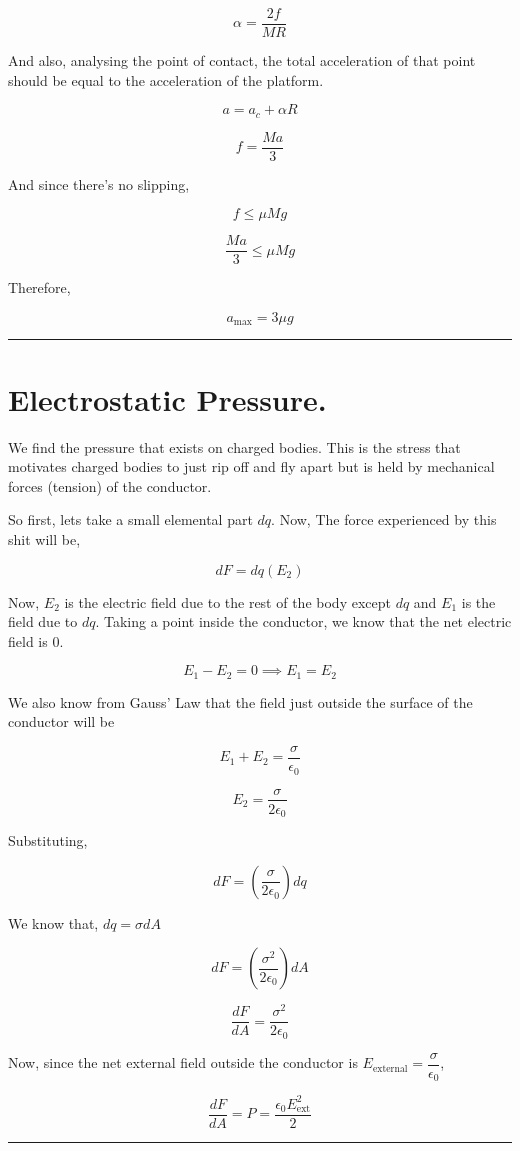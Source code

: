 \documentclass[twocolumn]{article}
\begin{document}
\[
    \alpha = \frac{2f}{M R}
\]

And also, analysing the point of contact, the total acceleration of that point should be equal to the acceleration of the platform. 

\[
    a = a_c + \alpha R
\]

\[
    f = \frac{Ma}{3}
\]

And since there's no slipping, 

\[
    f \leq  \mu Mg
\]

\[
    \frac{Ma}{3} \leq  \mu Mg
\]

Therefore, 

\[
    \boxed{a_{\text{max}} = 3\mu g}
\]

\vspace{0.1in}
\hrule

\section*{Electrostatic Pressure.}

We find the pressure that exists on charged bodies. This is the stress that motivates charged bodies to just rip off and fly apart but is held by mechanical forces (tension) of the conductor. 

So first, lets take a small elemental part \(dq\). Now, The force experienced by this shit will be,

\[
    dF = dq(E_2)
\]

Now, \(E_2\) is the electric field due to the rest of the body except \(dq\) and \(E_1\) is the field due to \(dq\). Taking a point inside the conductor, we know that the net electric field is 0. 

\[
    E_1 - E_2 = 0 \implies E_1 = E_2
\]

We also know from Gauss' Law that the field just outside the surface of the conductor will be 

\[
    E_1 + E_2 = \frac{\sigma}{\epsilon_0}
\]

\[
    E_2 = \frac{\sigma}{2\epsilon_0}
\]

Substituting, 

\[
    dF = (\frac{\sigma}{2\epsilon_0}) dq
\]

We know that, \(dq = \sigma dA\)

\[
    dF = (\frac{\sigma^{2}}{2 \epsilon_0})dA 
\]

\[
    \frac{dF}{dA} = \frac{\sigma^{2}}{2\epsilon_0}
\]

Now, since the net external field outside the conductor is \(E_{\text{external}} = \dfrac{\sigma}{\epsilon_0} \),

\[
    \boxed{\frac{dF}{dA} = P = \frac{\epsilon_0 E_{\text{ext} }^{2}}{2} }
\]

\vspace{0.1in}
\hrule 
\end{document}
